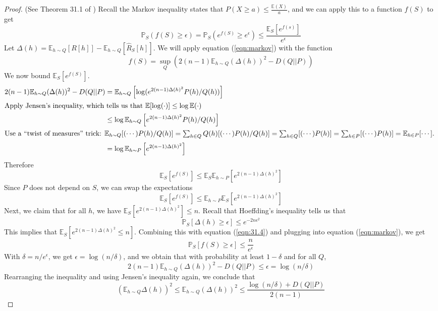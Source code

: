 \documentclass{article}
\begin{document}
\begin{proof}
(See Theorem 31.1 of \cite{Shalev2014})
Recall the Markov inequality states that $P(X\geq a) \leq \frac{\mathbb{E}(X)}{a}$, and we can apply this to a function $f(S)$ to get
\begin{equation}
\mathbb{P}_S(f(S)\geq \epsilon) = \mathbb{P}_S(e^{f(S)} \geq e^\epsilon) \leq \frac{\mathbb{E}_S[e^{f(s)}]}{e^\epsilon}
\label{eqn:markov}
\end{equation}
Let $\Delta(h) = \mathbb{E}_{h\sim Q}[R[h]] - \mathbb{E}_{h\sim Q}[\hat R_S[h]]$.
We will apply equation (\ref{eqn:markov}) with the function
\[f(S) = \sup_Q \left(2(n-1)\mathbb{E}_{h\sim Q}(\Delta(h))^2 - D(Q||P)\right)\]
We now bound $\mathbb{E}_S[e^{f(S)}]$.
\begin{align*}
2(n-1)\mathbb{E}_{h\sim Q}(\Delta(h))^2 - D(Q||P)
&= \mathbb{E}_{h\sim Q} \left[\log(e^{2(n-1)\Delta(h)^2}P(h)/Q(h))\right]\\
\intertext{Apply Jensen's inequality, which tells us that $\mathbb{E}[\log(\cdot)]\leq \log\mathbb{E}(\cdot)$}
&\leq \log\mathbb{E}_{h\sim Q} \left[e^{2(n-1)\Delta(h)^2}P(h)/Q(h)\right]\\
\intertext{Use a ``twist of measures'' trick: $\mathbb{E}_{h\sim Q}[(\cdots) P(h)/Q(h)] = \sum_{h\in Q} Q(h)[(\cdots) P(h)/Q(h)] = \sum_{h\in Q}[(\cdots) P(h)] = \sum_{h\in P}[(\cdots) P(h)] = \mathbb{E}_{h\in P}[\cdots]$. }
&= \log\mathbb{E}_{h\sim P} \left[e^{2(n-1)\Delta(h)^2}\right]
\end{align*}
Therefore
\[\mathbb{E}_S[e^{f(S)}] \leq \mathbb{E}_S\mathbb{E}_{h\sim P}[e^{2(n-1)\Delta(h)^2}]\]
Since $P$ does not depend on $S$, we can swap the expectations
\begin{equation}
\mathbb{E}_S[e^{f(S)}] \leq \mathbb{E}_{h\sim P}\mathbb{E}_S[e^{2(n-1)\Delta(h)^2}]
\label{eqn:31.4}
\end{equation}
Next, we claim that for all $h$, we have $\mathbb{E}_S[e^{2(n-1)\Delta(h)^2}] \leq n$.
Recall that Hoeffding's inequality tells us that
\[\mathbb{P}_S[\Delta(h) \geq \epsilon] \leq e^{-2n\epsilon^2}\]
This implies that $\mathbb{E}_S[e^{2(n-1)\Delta(h)^2} \leq n]$.
Combining this with equation (\ref{eqn:31.4}) and plugging into equation (\ref{eqn:markov}), we get
\[\mathbb{P}_S[f(S) \geq \epsilon] \leq \frac{n}{e^\epsilon}\]
With $\delta=n/e^\epsilon$, we get $\epsilon=\log(n/\delta)$, and we obtain that with probability at least $1-\delta$ and for all $Q$,
\[2(n-1)\mathbb{E}_{h\sim Q} (\Delta(h))^2 - D(Q||P) \leq \epsilon = \log(n/\delta)\]
Rearranging the inequality and using Jensen's inequality again, we conclude that
\[\left(\mathbb{E}_{h\sim Q}\Delta(h)\right)^2 \leq \mathbb{E}_{h\sim Q}(\Delta(h))^2 \leq \frac{\log(n/\delta) + D(Q||P)}{2(n-1)}\]
\end{proof}
\end{document}
